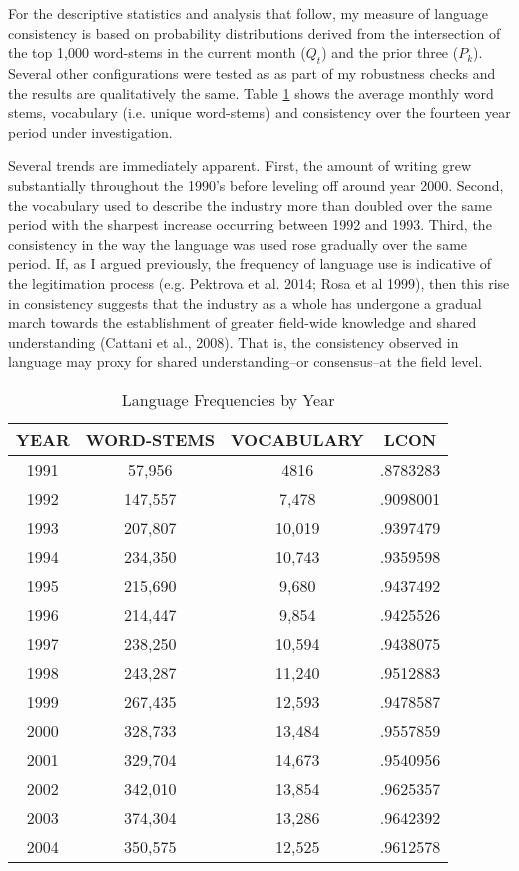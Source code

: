 For the descriptive statistics and analysis that follow, my measure of language consistency is based on probability distributions derived from the intersection of the top 1,000 word-stems in the current month ($Q_t$) and the prior three ($P_k$). Several other configurations were tested as as part of my robustness checks and the results are qualitatively the same. Table \ref{freq} shows the average monthly word stems, vocabulary (i.e. unique word-stems) and consistency over the fourteen year period under investigation.

Several trends are immediately apparent. First, the amount of writing grew substantially throughout the 1990's before leveling off around year 2000. Second, the vocabulary used to describe the industry more than doubled over the same period with the sharpest increase occurring between 1992 and 1993. Third, the consistency in the way the language was used rose gradually over the same period. If, as I argued previously, the frequency of language use is indicative of the legitimation process (e.g. Pektrova et al. 2014; Rosa et al 1999), then this rise in consistency suggests that the industry as a whole has undergone a gradual march towards the establishment of greater field-wide knowledge and shared understanding (Cattani et al., 2008). That is, the consistency observed in language may proxy for shared understanding--or consensus--at the field level.

\begin{table}
\begin{center}
\caption[Language Frequencies by Year]{Language Frequencies by Year \label{freq}}
\vspace{0.3in}
\begin{tabular}{cccc}
\hline 
\hline
YEAR & WORD-STEMS & VOCABULARY & LCON \\
\hline
1991 & 57,956 & 4816 & .8783283 \\
1992	 & 147,557 & 7,478 & .9098001 \\
1993 &  207,807 & 10,019 & .9397479 \\
1994 &  234,350 & 10,743 & .9359598 \\
1995 &  215,690 & 9,680 & .9437492 \\
1996 &  214,447 & 9,854 & .9425526 \\
1997 &  238,250 & 10,594 & .9438075 \\
1998 &  243,287 & 11,240 & .9512883 \\
1999 &  267,435 & 12,593 & .9478587 \\
2000 &  328,733 & 13,484 & .9557859 \\
2001 &  329,704 & 14,673 & .9540956 \\
2002 &  342,010 & 13,854 & .9625357 \\
2003 &  374,304 & 13,286 & .9642392 \\
2004 &  350,575 & 12,525 & .9612578 \\
\hline
\end{tabular}
\end{center}
\end{table}



